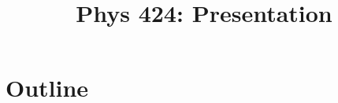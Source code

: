 \documentclass{beamer}
\title{Phys 424: Presentation}
\begin{document}
\begin{frame}
    \titlepage
\end{frame}

\section*{Outline}
\begin{frame}
    \tableofcontents
\end{frame}

\begin{frame}
\end{frame}
\end{document}
